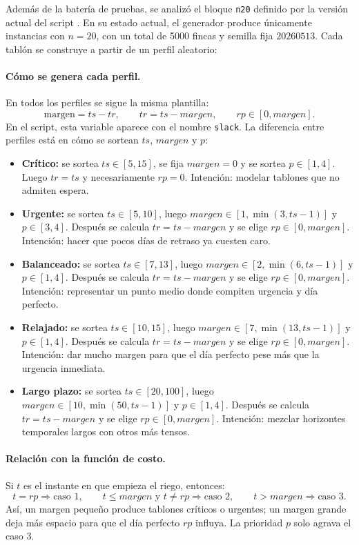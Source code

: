 \documentclass[12pt,a4paper]{article}
\begin{document}
Adem\'as de la bater\'ia de pruebas, se analiz\'o el bloque \texttt{n20} definido por la versi\'on actual del script . En su estado actual, el generador produce \'unicamente instancias con \(n=20\), con un total de 5000 fincas y semilla fija \(20260513\). Cada tabl\'on se construye a partir de un perfil aleatorio:

\paragraph{C\'omo se genera cada perfil.}
En todos los perfiles se sigue la misma plantilla:
\[
\text{margen}=ts-tr,\qquad tr=ts-margen,\qquad rp \in [0,margen].
\]
En el script, esta variable aparece con el nombre \texttt{slack}. La diferencia entre perfiles est\'a en c\'omo se sortean \(ts\), \(margen\) y \(p\):
\begin{itemize}
  \item \textbf{Cr\'itico:} se sortea \(ts \in [5,15]\), se fija \(margen=0\) y se sortea \(p \in [1,4]\). Luego \(tr=ts\) y necesariamente \(rp=0\). Intenci\'on: modelar tablones que no admiten espera.
  \item \textbf{Urgente:} se sortea \(ts \in [5,10]\), luego \(margen \in [1,\min(3,ts-1)]\) y \(p \in [3,4]\). Despu\'es se calcula \(tr=ts-margen\) y se elige \(rp \in [0,margen]\). Intenci\'on: hacer que pocos d\'ias de retraso ya cuesten caro.
  \item \textbf{Balanceado:} se sortea \(ts \in [7,13]\), luego \(margen \in [2,\min(6,ts-1)]\) y \(p \in [1,4]\). Despu\'es se calcula \(tr=ts-margen\) y se elige \(rp \in [0,margen]\). Intenci\'on: representar un punto medio donde compiten urgencia y d\'ia perfecto.
  \item \textbf{Relajado:} se sortea \(ts \in [10,15]\), luego \(margen \in [7,\min(13,ts-1)]\) y \(p \in [1,4]\). Despu\'es se calcula \(tr=ts-margen\) y se elige \(rp \in [0,margen]\). Intenci\'on: dar mucho margen para que el d\'ia perfecto pese m\'as que la urgencia inmediata.
  \item \textbf{Largo plazo:} se sortea \(ts \in [20,100]\), luego \(margen \in [10,\min(50,ts-1)]\) y \(p \in [1,4]\). Despu\'es se calcula \(tr=ts-margen\) y se elige \(rp \in [0,margen]\). Intenci\'on: mezclar horizontes temporales largos con otros m\'as tensos.
\end{itemize}

\paragraph{Relaci\'on con la funci\'on de costo.}
Si \(t\) es el instante en que empieza el riego, entonces:
\[
t=rp \Rightarrow \text{caso 1},\qquad
t\leq margen \text{ y } t\neq rp \Rightarrow \text{caso 2},\qquad
t>margen \Rightarrow \text{caso 3}.
\]
As\'i, un margen peque\~no produce tablones cr\'iticos o urgentes; un margen grande deja m\'as espacio para que el d\'ia perfecto \(rp\) influya. La prioridad \(p\) solo agrava el caso 3.
\end{document}
